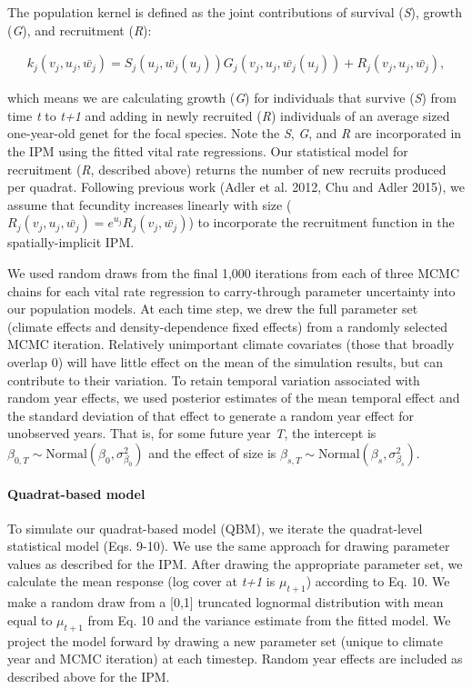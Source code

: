 \documentclass[12pt,]{article}
\begin{document}
The population kernel is defined as the joint contributions of survival
(\emph{S}), growth (\emph{G}), and recruitment (\emph{R}):

\vspace{-3em}\begin{align}
k_{j}(v_{j},u_{j},\bar{w_{j}}) = S_j(u_j, \bar{w_{j}}(u_{j}))G_j(v_{j},u_{j},\bar{w_{j}}(u_{j})) + R_j(v_{j},u_{j},\bar{w_{j}}),
\end{align}\vspace{-3em}

which means we are calculating growth (\emph{G}) for individuals that
survive (\emph{S}) from time \emph{t} to \emph{t+1} and adding in newly
recruited (\emph{R}) individuals of an average sized one-year-old genet
for the focal species. Note the \emph{S}, \emph{G}, and \emph{R} are
incorporated in the IPM using the fitted vital rate regressions. Our
statistical model for recruitment (\emph{R}, described above) returns
the number of new recruits produced per quadrat. Following previous work
(Adler et al. 2012, Chu and Adler 2015), we assume that fecundity
increases linearly with size
(\(R_j(v_{j},u_{j},\bar{w_{j}}) = e^{u_j}R_j(v_{j},\bar{w_{j}})\)) to
incorporate the recruitment function in the spatially-implicit IPM.

We used random draws from the final 1,000 iterations from each of three
MCMC chains for each vital rate regression to carry-through parameter
uncertainty into our population models. At each time step, we drew the
full parameter set (climate effects and density-dependence fixed
effects) from a randomly selected MCMC iteration. Relatively unimportant
climate covariates (those that broadly overlap 0) will have little
effect on the mean of the simulation results, but can contribute to
their variation. To retain temporal variation associated with random
year effects, we used posterior estimates of the mean temporal effect
and the standard deviation of that effect to generate a random year
effect for unobserved years. That is, for some future year \emph{T}, the
intercept is
\(\beta_{0,T} \sim \text{Normal}(\beta_0, \sigma_{\beta_0}^2)\) and the
effect of size is
\(\beta_{s,T} \sim \text{Normal}(\beta_s, \sigma_{\beta_s}^2)\).

\paragraph{Quadrat-based model}\label{quadrat-based-model}

To simulate our quadrat-based model (QBM), we iterate the quadrat-level
statistical model (Eqs. 9-10). We use the same approach for drawing
parameter values as described for the IPM. After drawing the appropriate
parameter set, we calculate the mean response (log cover at \emph{t+1}
is \(\mu_{t+1}\)) according to Eq. 10. We make a random draw from a
{[}0,1{]} truncated lognormal distribution with mean equal to
\(\mu_{t+1}\) from Eq. 10 and the variance estimate from the fitted
model. We project the model forward by drawing a new parameter set
(unique to climate year and MCMC iteration) at each timestep. Random
year effects are included as described above for the IPM.
\end{document}
